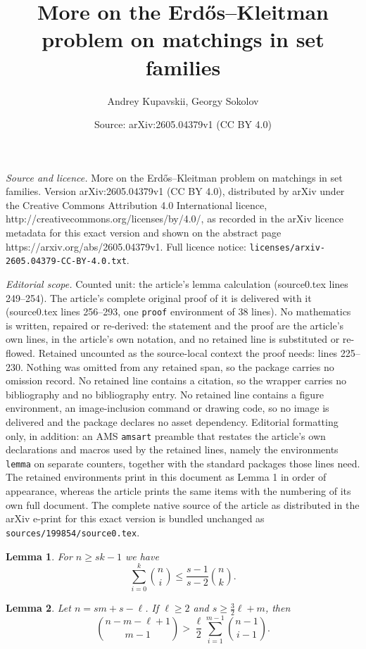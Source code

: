 \documentclass[10pt,a4paper]{amsart}
\title{More on the Erd\H os--Kleitman problem on matchings in set families}
\author{Andrey Kupavskii, Georgy Sokolov}
\date{Source: arXiv:2605.04379v1 (CC BY 4.0)}
\newtheorem{lemma}{Lemma}
\begin{document}
\maketitle

\noindent\emph{Source and licence.} More on the Erd\H os--Kleitman problem on matchings in set families. Version arXiv:2605.04379v1 (CC BY 4.0), distributed by arXiv under the Creative Commons Attribution 4.0 International licence, http://creativecommons.org/licenses/by/4.0/, as recorded in the arXiv licence metadata for this exact version and shown on the abstract page https://arxiv.org/abs/2605.04379v1. Full licence notice: \texttt{licenses/arxiv-2605.04379-CC-BY-4.0.txt}.\par\smallskip

\noindent\textit{Editorial scope.} Counted unit: the article's lemma calculation (source0.tex lines 249--254). The article's complete original proof of it is delivered with it (source0.tex lines 256--293, one \texttt{proof} environment of 38 lines). No mathematics is written, repaired or re-derived: the statement and the proof are the article's own lines, in the article's own notation, and no retained line is substituted or re-flowed.  Retained uncounted as the source-local context the proof needs: lines 225--230.  Nothing was omitted from any retained span, so the package carries no omission record.  No retained line contains a citation, so the wrapper carries no bibliography and no bibliography entry.  No retained line contains a figure environment, an image-inclusion command or drawing code, so no image is delivered and the package declares no asset dependency.  Editorial formatting only, in addition: an AMS \texttt{amsart} preamble that restates the article's own declarations and macros used by the retained lines, namely the environments \texttt{lemma} on separate counters, together with the standard packages those lines need.  The retained environments print in this document as Lemma 1 in order of appearance, whereas the article prints the same items with the numbering of its own full document.  The complete native source of the article as distributed in the arXiv e-print for this exact version is bundled unchanged as \texttt{sources/199854/source0.tex}.
\begin{lemma} \label{l: low layers are small}
    For $n \geq sk - 1$ we have
    \[
    \sum_{i=0}^{k}{n \choose i} \leq \frac{s-1}{s-2}{n \choose k}.
    \]
\end{lemma}

\begin{lemma} \label{l: HM calculation}
    Let $n = sm + s - \ell$. If $\ell \geq 2$ and $s \geq \frac{3}{2}\ell + m$, then
    \begin{equation} \label{eq: HM calculation}
        {n - m - \ell + 1 \choose m -1} > \frac{\ell}{2}\sum_{i=1}^{m-1}{n-1 \choose i - 1}.
    \end{equation}
\end{lemma}
\end{document}
